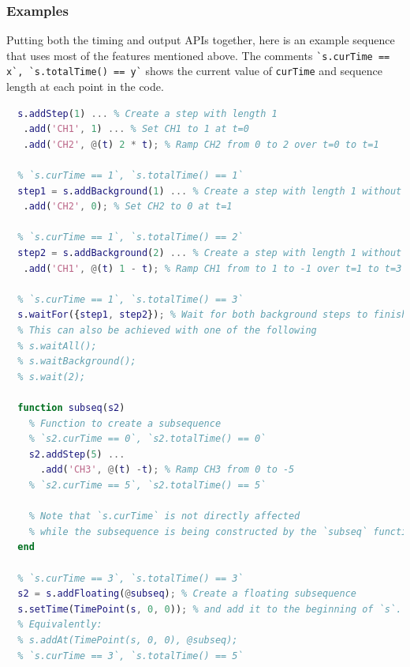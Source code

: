 \subsubsection{Examples}

Putting both the timing and output APIs together,
here is an example sequence that uses most of the features mentioned above.
The comments \lstinline{`s.curTime == x`, `s.totalTime() == y`}
shows the current value of \lstinline{curTime} and sequence length
at each point in the code.

\begin{lstlisting}[language=Matlab]
  % `s.curTime == 0`, `s.totalTime() == 0`
  s.addStep(1) ... % Create a step with length 1
   .add('CH1', 1) ... % Set CH1 to 1 at t=0
   .add('CH2', @(t) 2 * t); % Ramp CH2 from 0 to 2 over t=0 to t=1

  % `s.curTime == 1`, `s.totalTime() == 1`
  step1 = s.addBackground(1) ... % Create a step with length 1 without changing `curTime`
   .add('CH2', 0); % Set CH2 to 0 at t=1

  % `s.curTime == 1`, `s.totalTime() == 2`
  step2 = s.addBackground(2) ... % Create a step with length 1 without changing `curTime`
   .add('CH1', @(t) 1 - t); % Ramp CH1 from to 1 to -1 over t=1 to t=3

  % `s.curTime == 1`, `s.totalTime() == 3`
  s.waitFor({step1, step2}); % Wait for both background steps to finish
  % This can also be achieved with one of the following
  % s.waitAll();
  % s.waitBackground();
  % s.wait(2);

  function subseq(s2)
    % Function to create a subsequence
    % `s2.curTime == 0`, `s2.totalTime() == 0`
    s2.addStep(5) ...
      .add('CH3', @(t) -t); % Ramp CH3 from 0 to -5
    % `s2.curTime == 5`, `s2.totalTime() == 5`

    % Note that `s.curTime` is not directly affected
    % while the subsequence is being constructed by the `subseq` function.
  end

  % `s.curTime == 3`, `s.totalTime() == 3`
  s2 = s.addFloating(@subseq); % Create a floating subsequence
  s.setTime(TimePoint(s, 0, 0)); % and add it to the beginning of `s`.
  % Equivalently:
  % s.addAt(TimePoint(s, 0, 0), @subseq);
  % `s.curTime == 3`, `s.totalTime() == 5`
\end{lstlisting}

